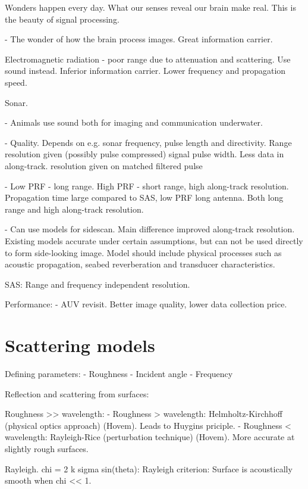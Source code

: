 
Wonders happen every day. What our senses reveal our brain make real. This is the beauty of signal processing.

- The wonder of how the brain process images. Great information carrier.


Electromagnetic radiation - poor range due to attenuation and scattering. Use sound instead. Inferior information carrier. Lower frequency and propagation speed.

Sonar. 

- Animals use sound both for imaging and communication underwater.

- Quality. Depends on e.g. sonar frequency, pulse length and directivity. Range resolution given (possibly pulse compressed) signal pulse width. Less data in along-track. resolution given on matched filtered pulse 

- Low PRF - long range. High PRF - short range, high along-track resolution. Propagation time large compared to  SAS, low PRF long antenna. Both long range and high along-track resolution.

- Can use models for sidescan. Main difference improved along-track resolution. Existing models accurate under certain assumptions, but can not be used directly to form side-looking image. Model should include physical processes such as acoustic propagation, seabed reverberation and transducer characteristics.

SAS: Range and frequency independent resolution.


Performance:
- AUV revisit. Better image quality, lower data collection price.

\section{Scattering models}

Defining parameters:
- Roughness
- Incident angle
- Frequency


Reflection and scattering from surfaces:

Roughness >> wavelength:
- Roughness > wavelength: Helmholtz-Kirchhoff (physical optics approach) (Hovem). Leads to Huygins priciple.
- Roughness < wavelength: Rayleigh-Rice (perturbation technique) (Hovem). More accurate at slightly rough surfaces.

Rayleigh. chi = 2 k sigma sin(theta): Rayleigh criterion: Surface is acoustically smooth when chi << 1.